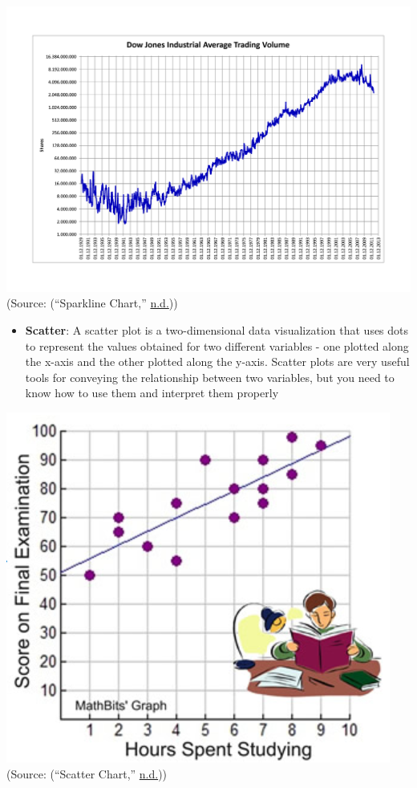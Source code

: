\documentclass[]{book}
\providecommand{\tightlist}{%
  \setlength{\itemsep}{0pt}\setlength{\parskip}{0pt}}
\begin{document}
\includegraphics{images/Image4.png}
(Source: (``Sparkline Chart,'' \protect\hyperlink{ref-sparklines}{n.d.}))

\begin{itemize}
\tightlist
\item
  \textbf{Scatter}: A scatter plot is a two-dimensional data visualization that uses dots to represent the values obtained for two different variables - one plotted along the x-axis and the other plotted along the y-axis. Scatter plots are very useful tools for conveying the relationship between two variables, but you need to know how to use them and interpret them properly
\end{itemize}

\includegraphics{images/Image5.png}
(Source: (``Scatter Chart,'' \protect\hyperlink{ref-scatter}{n.d.}))
\end{document}
